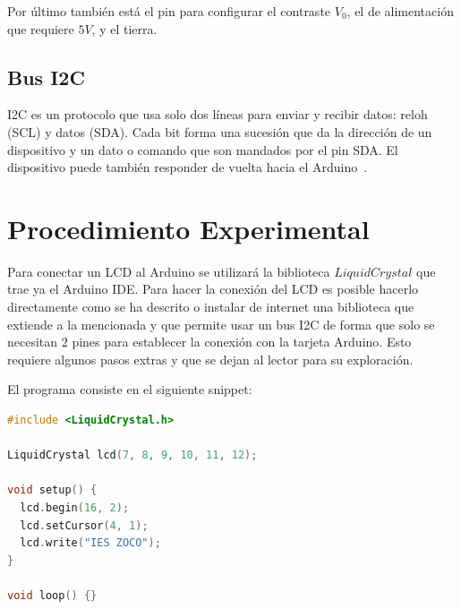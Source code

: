 \documentclass{article}
\begin{document}
    Por último también está el pin para configurar el contraste $V_0$, el de
    alimentación que requiere $5V$, y el tierra.

    \subsection{Bus I2C}

    I2C es un protocolo que usa solo dos líneas para enviar y recibir datos:
    reloh (SCL) y datos (SDA). Cada bit forma una sucesión que da la
    dirección de un dispositivo y un dato o comando que son mandados por el
    pin SDA. El dispositivo puede también responder de vuelta hacia el
    Arduino~\cite{arduino-docs-i2c-2021}.

    \section{Procedimiento Experimental}\label{sec:procedimiento-experimental}

    Para conectar un LCD al Arduino se utilizará la biblioteca
    $LiquidCrystal$ que trae ya el Arduino IDE. Para hacer la conexión del
    LCD es posible hacerlo directamente como se ha descrito o instalar de
    internet una biblioteca que extiende a la mencionada y que permite usar
    un bus I2C de forma que solo se necesitan $2$ pines para establecer la
    conexión con la tarjeta Arduino. Esto requiere algunos pasos extras y que
    se dejan al lector para su exploración.

    \bigbreak

    El programa consiste en el siguiente snippet:

    \begin{lstlisting}[language=C, caption=Arduino Sketch,label={lst:lstlisting}]
#include <LiquidCrystal.h>

LiquidCrystal lcd(7, 8, 9, 10, 11, 12);

void setup() {
  lcd.begin(16, 2);
  lcd.setCursor(4, 1);
  lcd.write("IES ZOCO");
}

void loop() {}
    \end{lstlisting}
\end{document}
